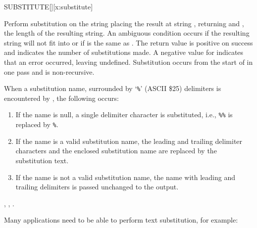 \begin{worddef*}{}{SUBSTITUTE}[][x:substitute]
\item {}

	Perform substitution on the string  placing the
	result at string , returning  and
	, the length of the resulting string.
	An ambiguous condition occurs if the resulting string will not fit into
	 or if  is the same as .
	The return value  is positive on success and indicates the number
	of substitutions made.
	A negative value for  indicates that an error occurred, leaving
	 undefined.  Substitution occurs from the
	start of  in one pass and is non-recursive.

	When a substitution name, surrounded by `\texttt{\%}' (ASCII \$25) delimiters
	is encountered by , the following occurs:

	\begin{enumerate}
	\item If the name is null, a single delimiter character is substituted,
		i.e., \texttt{\%\%} is replaced by \texttt{\%}.

	\item If the name is a valid substitution name, the leading and trailing
		delimiter characters and the enclosed substitution name are replaced by
		the substitution text.

	\item If the name is not a valid substitution name, the name with leading
		and trailing delimiters is passed unchanged to the output.
	\end{enumerate}

\see {}, , .

	\begin{rationale}

		Many applications need to be able to perform text substitution, for
		example:


\end{rationale}
\end{worddef*}
